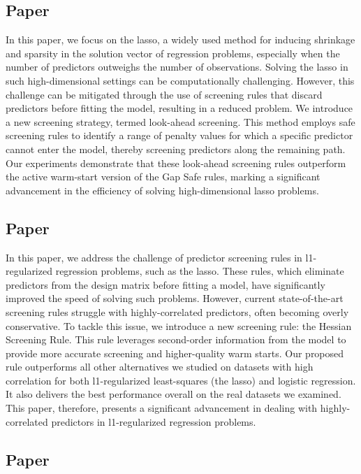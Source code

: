 \subsection{Paper \II}

In this paper, we focus on the lasso, a widely used method for inducing shrinkage and sparsity in the solution vector of regression problems, especially when the number of predictors outweighs the number of observations. Solving the lasso in such high-dimensional settings can be computationally challenging. However, this challenge can be mitigated through the use of screening rules that discard predictors before fitting the model, resulting in a reduced problem. We introduce a new screening strategy, termed look-ahead screening. This method employs safe screening rules to identify a range of penalty values for which a specific predictor cannot enter the model, thereby screening predictors along the remaining path. Our experiments demonstrate that these look-ahead screening rules outperform the active warm-start version of the Gap Safe rules, marking a significant advancement in the efficiency of solving high-dimensional lasso problems.

\subsection{Paper \III}

In this paper, we address the challenge of predictor screening rules in l1-regularized regression problems, such as the lasso. These rules, which eliminate predictors from the design matrix before fitting a model, have significantly improved the speed of solving such problems. However, current state-of-the-art screening rules struggle with highly-correlated predictors, often becoming overly conservative. To tackle this issue, we introduce a new screening rule: the Hessian Screening Rule. This rule leverages second-order information from the model to provide more accurate screening and higher-quality warm starts. Our proposed rule outperforms all other alternatives we studied on datasets with high correlation for both l1-regularized least-squares (the lasso) and logistic regression. It also delivers the best performance overall on the real datasets we examined. This paper, therefore, presents a significant advancement in dealing with highly-correlated predictors in l1-regularized regression problems.

\subsection{Paper \IV}

